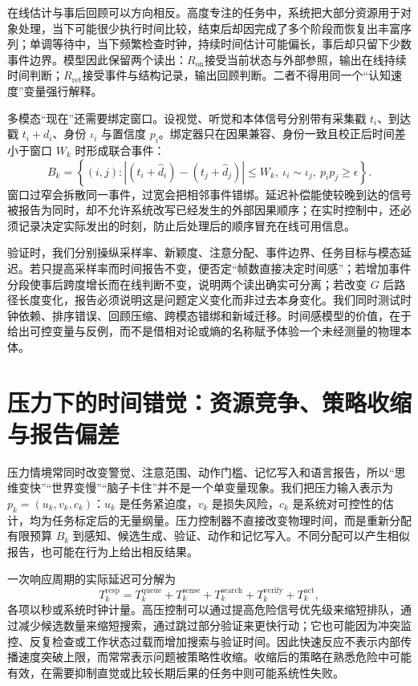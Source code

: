 在线估计与事后回顾可以方向相反。高度专注的任务中，系统把大部分资源用于对象处理，当下可能很少执行时间比较，结束后却因完成了多个阶段而恢复出丰富序列；单调等待中，当下频繁检查时钟，持续时间估计可能偏长，事后却只留下少数事件边界。模型因此保留两个读出：$R_{\mathrm{on}}$接受当前状态与外部参照，输出在线持续时间判断；$R_{\mathrm{ret}}$接受事件与结构记录，输出回顾判断。二者不得用同一个“认知速度”变量强行解释。

多模态“现在”还需要绑定窗口。设视觉、听觉和本体信号分别带有采集戳 $t_i$、到达戳 $t_i+d_i$、身份 $\iota_i$ 与置信度 $p_i$。绑定器只在因果兼容、身份一致且校正后时间差小于窗口 $W_k$ 时形成联合事件：
\[
B_k=\left\{(i,j): |(t_i+\hat d_i)-(t_j+\hat d_j)|\leq W_k,
\ \iota_i\sim\iota_j,\ p_ip_j\geq\epsilon\right\}.
\]
窗口过窄会拆散同一事件，过宽会把相邻事件错绑。延迟补偿能使较晚到达的信号被报告为同时，却不允许系统改写已经发生的外部因果顺序；在实时控制中，还必须记录决定实际发出的时刻，防止后处理后的顺序冒充在线可用信息。

验证时，我们分别操纵采样率、新颖度、注意分配、事件边界、任务目标与模态延迟。若只提高采样率而时间报告不变，便否定“帧数直接决定时间感”；若增加事件分段使事后跨度增长而在线判断不变，说明两个读出确实可分离；若改变 $G$ 后路径长度变化，报告必须说明这是问题定义变化而非过去本身变化。我们同时测试时钟依赖、排序错误、回顾压缩、跨模态错绑和新域迁移。时间感模型的价值，在于给出可控变量与反例，而不是借相对论或熵的名称赋予体验一个未经测量的物理本体。

\section{压力下的时间错觉：资源竞争、策略收缩与报告偏差}
\label{sec:psychological_illusion_of_time}
压力情境常同时改变警觉、注意范围、动作门槛、记忆写入和语言报告，所以“思维变快”“世界变慢”“脑子卡住”并不是一个单变量现象。我们把压力输入表示为 $p_k=(u_k,v_k,c_k)$：$u_k$ 是任务紧迫度，$v_k$ 是损失风险，$c_k$ 是系统对可控性的估计，均为任务标定后的无量纲量。压力控制器不直接改变物理时间，而是重新分配有限预算 $B_k$ 到感知、候选生成、验证、动作和记忆写入。不同分配可以产生相似报告，也可能在行为上给出相反结果。

一次响应周期的实际延迟可分解为
\[
T_k^{\mathrm{resp}}=T_k^{\mathrm{queue}}+T_k^{\mathrm{sense}}+
T_k^{\mathrm{search}}+T_k^{\mathrm{verify}}+T_k^{\mathrm{act}},
\]
各项以秒或系统时钟计量。高压控制可以通过提高危险信号优先级来缩短排队，通过减少候选数量来缩短搜索，通过跳过部分验证来更快行动；它也可能因为冲突监控、反复检查或工作状态过载而增加搜索与验证时间。因此快速反应不表示内部传播速度突破上限，而常常表示问题被策略性收缩。收缩后的策略在熟悉危险中可能有效，在需要抑制直觉或比较长期后果的任务中则可能系统性失败。

